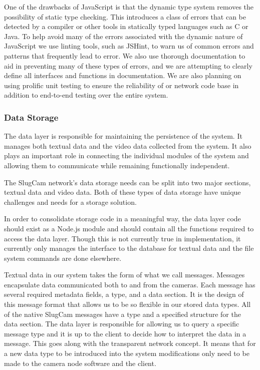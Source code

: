 One of the drawbacks of JavaScript is that the dynamic type system removes the
possibility of static type checking. This introduces a class of errors that can
be detected by a compiler or other tools in statically typed languages such as C
or Java. To help avoid many of the errors associated with the dynamic nature of
JavaScript we use linting tools, such as JSHint, to warn us of common errors and
patterns that frequently lead to error. We also use thorough documentation to
aid in preventing many of these types of errors, and we are attempting to clearly
define all interfaces and functions in documentation.  We are also planning on
using prolific unit testing to ensure the reliability of or network code base in
addition to end-to-end testing over the entire system.

\subsubsection{Data Storage}

The data layer is responsible for maintaining the persistence of the system. It
manages both textual data and the video data collected from the system. It also
plays an important role in connecting the individual modules of the system and
allowing them to communicate while remaining functionally independent.

The SlugCam network's data storage needs can be split into two major sections,
textual data and video data. Both of these types of data storage have unique
challenges and needs for a storage solution.

In order to consolidate storage code in a meaningful way, the data layer code
should exist as a Node.js module and should contain all the functions required
to access the data layer. Though this is not currently true in implementation,
it currently only manages the interface to the database for textual data and the
file system commands are done elsewhere.


Textual data in our system takes the form of what we call messages. Messages
encapsulate data communicated both to and from the cameras. Each message has
several required metadata fields, a type, and a data section. It is the design
of this message format that allows us to be so flexible in our stored data
types. All of the native SlugCam messages have a type and a specified structure
for the data section. The data layer is responsible for allowing us to query a
specific message type and it is up to the client to decide how to interpret the
data in a message. This goes along with the transparent network concept. It
means that for a new data type to be introduced into the system modifications
only need to be made to the camera node software and the client.

